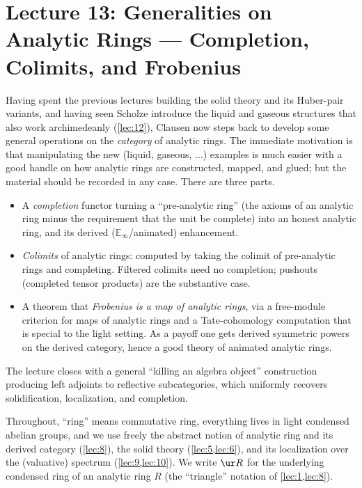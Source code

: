 \section{Lecture 13: Generalities on Analytic Rings --- Completion, Colimits, and Frobenius}
\label{lec:13}

Having spent the previous lectures building the solid theory and its Huber-pair
variants, and having seen Scholze introduce the liquid and gaseous structures
that also work archimedeanly (\cref{lec:12}), Clausen now steps back to develop
some general operations on the \emph{category} of analytic rings. The immediate
motivation is that manipulating the new (liquid, gaseous, $\dots$) examples is
much easier with a good handle on how analytic rings are constructed, mapped,
and glued; but the material should be recorded in any case. There are three
parts.

\begin{itemize}
\item A \emph{completion} functor turning a ``pre-analytic ring'' (the axioms of
an analytic ring minus the requirement that the unit be complete) into an
honest analytic ring, and its derived ($\mathbb{E}_\infty$/animated)
enhancement.
\item \emph{Colimits} of analytic rings: computed by taking the colimit of
pre-analytic rings and completing. Filtered colimits need no completion;
pushouts (completed tensor products) are the substantive case.
\item A theorem that \emph{Frobenius is a map of analytic rings}, via a
free-module criterion for maps of analytic rings and a Tate-cohomology
computation that is special to the light setting. As a payoff one gets derived
symmetric powers on the derived category, hence a good theory of animated
analytic rings.
\end{itemize}

The lecture closes with a general ``killing an algebra object'' construction
producing left adjoints to reflective subcategories, which uniformly recovers
solidification, localization, and completion.

Throughout, ``ring'' means commutative ring, everything lives in light condensed
abelian groups, and we use freely the abstract notion of analytic ring and its
derived category (\cref{lec:8}), the solid theory (\cref{lec:5,lec:6}), and its
localization over the (valuative) spectrum (\cref{lec:9,lec:10}). We write $\ur R$
for the underlying condensed ring of an analytic ring $R$ (the ``triangle''
notation of \cref{lec:1,lec:8}).

